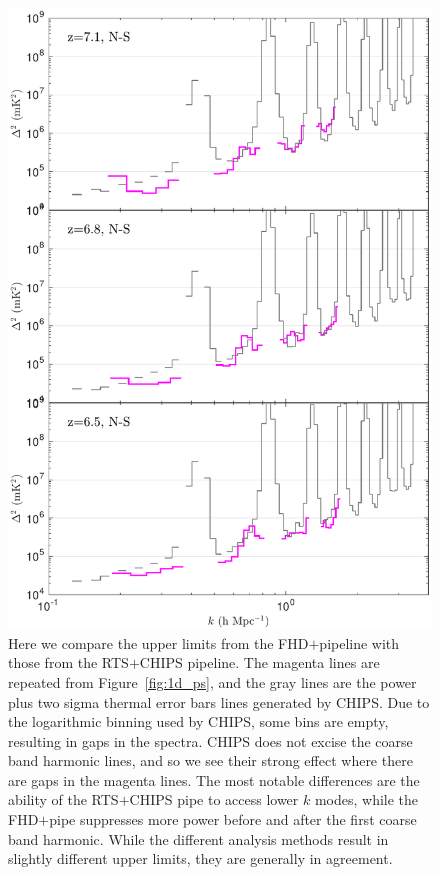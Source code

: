 \documentclass[iop]{emulateapj}
\begin{document}
\begin{figure}
\includegraphics[width=\columnwidth]{1D_spectra_comparison.pdf}
\caption{
Here we compare the upper limits from the FHD$+$\eppsilon pipeline with those from the 
RTS$+$CHIPS pipeline. The magenta lines are repeated from Figure~\ref{fig:1d_ps}, and the gray lines
are the power plus two sigma thermal error bars lines generated by CHIPS. 
Due to the logarithmic binning used by CHIPS, some bins are empty, resulting in gaps in the
spectra.
CHIPS does not 
excise the coarse band harmonic lines, and so we see their strong effect where there are 
gaps in the magenta lines. The most notable differences are the ability of the RTS$+$CHIPS pipe
to access lower $k$ modes, while the FHD$+$\eppsilon pipe suppresses more power before and
after the first coarse band harmonic. While the different analysis methods result in slightly
different upper limits, they are generally in agreement. 
\label{fig:ps_comparison}
}
\end{figure}
\end{document}
